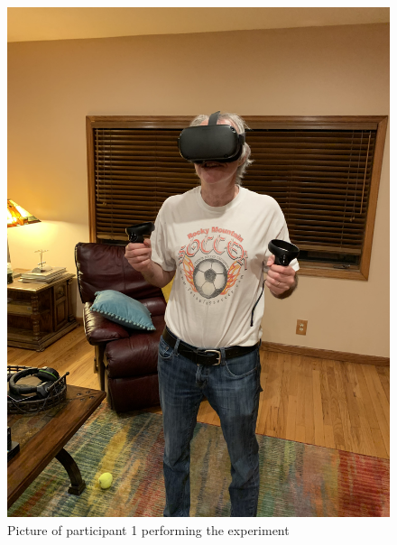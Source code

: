 \documentclass{sigchi}
\begin{document}
\begin{figure}
    \centering
    \includegraphics[scale=0.04, angle=270]{figures/Participant1.jpeg}
    \caption{Picture of participant 1 performing the experiment}
    \label{fig:my_label2}
\end{figure}
\end{document}
